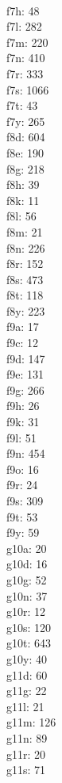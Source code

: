 \begin{multicols}{8}
  \\ f7h: 48
  \\ f7l: 282
  \\ f7m: 220
  \\ f7n: 410
  \\ f7r: 333
  \\ f7s: 1066
  \\ f7t: 43
  \\ f7y: 265
  \\ f8d: 604
  \\ f8e: 190
  \\ f8g: 218
  \\ f8h: 39
  \\ f8k: 11
  \\ f8l: 56
  \\ f8m: 21
  \\ f8n: 226
  \\ f8r: 152
  \\ f8s: 473
  \\ f8t: 118
  \\ f8y: 223
  \\ f9a: 17
  \\ f9c: 12
  \\ f9d: 147
  \\ f9e: 131
  \\ f9g: 266
  \\ f9h: 26
  \\ f9k: 31
  \\ f9l: 51
  \\ f9n: 454
  \\ f9o: 16
  \\ f9r: 24
  \\ f9s: 309
  \\ f9t: 53
  \\ f9y: 59
  \\ g10a: 20
  \\ g10d: 16
  \\ g10g: 52
  \\ g10n: 37
  \\ g10r: 12
  \\ g10s: 120
  \\ g10t: 643
  \\ g10y: 40
  \\ g11d: 60
  \\ g11g: 22
  \\ g11l: 21
  \\ g11m: 126
  \\ g11n: 89
  \\ g11r: 20
  \\ g11s: 71

\end{multicols}

